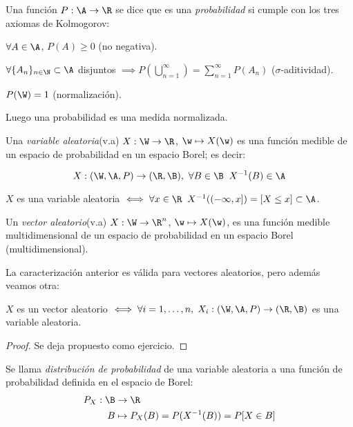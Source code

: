 \begin{ndef}[Probabilidad]
  Una función $P: \A \to \R$ se dice que es una \emph{probabilidad} si cumple con los tres axiomas de Kolmogorov:
  \begin{nlist}
    \item $\forall A \in \A$, $P(A) \geq 0$ (no negativa).
    \item $\forall \{A_n\}_{n \in \N} \subset \A$ disjuntos $\implies P(\bigcup \limits^\infty_{n = 1}) = \sum \limits^\infty_{n = 1} P(A_n)$ ($\sigma$-aditividad).
    \item $P(\W) = 1$ (normalización).
  \end{nlist}
  Luego una probabilidad es una medida normalizada.
\end{ndef}

\begin{ndef}
  Una \emph{variable aleatoria}(v.a) $X : \W \to \R$, $\w \mapsto X(\w)$ es una función medible de un espacio de probabilidad en un espacio Borel; es decir:

  $$X : (\W, \A, P) \to (\R, \B), \, \, \forall B \in \B \; \; X^{-1}(B) \in \A$$
\end{ndef}

\begin{nprop}
  $X$ es una variable aleatoria $\iff \forall x \in \R \; \; X^{-1}((-\infty, x]) = [X \leq x] \subset \A$.
\end{nprop}

\begin{ndef}
  Un \emph{vector aleatorio}(v.a) $X : \W \to \R^n$, $\w \mapsto X(\w)$, es una función medible multidimensional de un espacio de probabilidad en un espacio Borel (multidimensional).
\end{ndef}

La caracterización anterior es válida para vectores aleatorios, pero además veamos otra:

\begin{ndef}
  $X$ es un vector aleatorio $\iff \forall i = 1, \ldots, n, \; X_i : (\W, \A, P) \to (\R, \B)$ es una variable aleatoria.
\end{ndef}

\begin{proof}
  Se deja propuesto como ejercicio.
\end{proof}


\begin{ndef}
  Se llama \emph{distribución de probabilidad} de una variable aleatoria a una función de probabilidad definida en el espacio de Borel:
  \begin{align*}
    P_X : \B & \to \R \\
    B & \mapsto P_X(B) = P(X^{-1}(B)) = P[X \in B]
  \end{align*}
\end{ndef}

